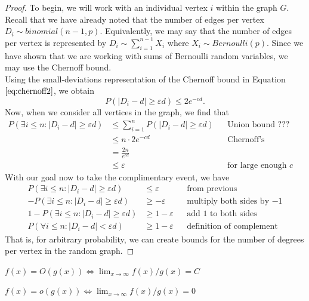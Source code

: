 \begin{proof}
To begin, we will work with an individual vertex $i$ within the graph $G$. Recall that we have already noted that the number of edges per vertex $D_i \sim binomial(n-1, p)$. Equivalently, we may say that the number of edges per vertex is represented by $D_i \sim \sum_{i=1}^{n-1} X_i$ where $X_i \sim Bernoulli(p).$ Since we have shown that we are working with sums of Bernoulli random variables, we may use the Chernoff bound.  \\ 

Using the small-deviations representation of the Chernoff bound in Equation $\ref{eq:chernoff2}$, we obtain 
$$ P\left( |D_i - d| \geq \varepsilon d \right) \leq 2e^{-cd}. $$
Now, when we consider all vertices in the graph, we find that 
    \begin{align*}
    P\left( \exists i\leq n: |D_i - d| \geq \varepsilon d \right) &\leq \sum_{i=1}^{n}P\left( |D_i - d| \geq \varepsilon d\right) && \text{Union bound ???} \\ 
    &\leq n \cdot 2e^{-cd} && \text{Chernoff's inequality for each vertex} \\ 
    &= \frac{2n}{e^{cd}}  \\ 
    &\leq \varepsilon &&\text{for large enough $c$} 
    \end{align*}
With our goal now to take the complimentary event, we have 
    \begin{align*}
    P\left( \exists i\leq n: |D_i - d| \geq \varepsilon d \right) &\leq \varepsilon &&\text{from previous} \\ 
    -P\left( \exists i\leq n: |D_i - d| \geq \varepsilon d \right) &\geq -\varepsilon &&\text{multiply both sides by $-1$} \\ 
    1-P\left( \exists i\leq n: |D_i - d| \geq \varepsilon d \right) &\geq 1-\varepsilon &&\text{add $1$ to both sides} \\ 
    P\left( \forall i \leq n: |D_i - d| < \varepsilon d \right) &\geq 1-\varepsilon &&\text{definition of complement} 
    \end{align*}
    That is, for arbitrary probability, we can create bounds for the number of degrees per vertex in the random graph.  
\end{proof}


\begin{tcolorbox}
    \begin{definition}
    $f(x) = O(g(x)) \iff \lim_{x\to\infty} f(x)/g(x) = C$
    \end{definition}
%
    \begin{definition}[o Notation]
    $f(x) = o(g(x)) \iff \lim_{x\to\infty} f(x)/g(x) = 0$ 
    \end{definition}
\end{tcolorbox}


